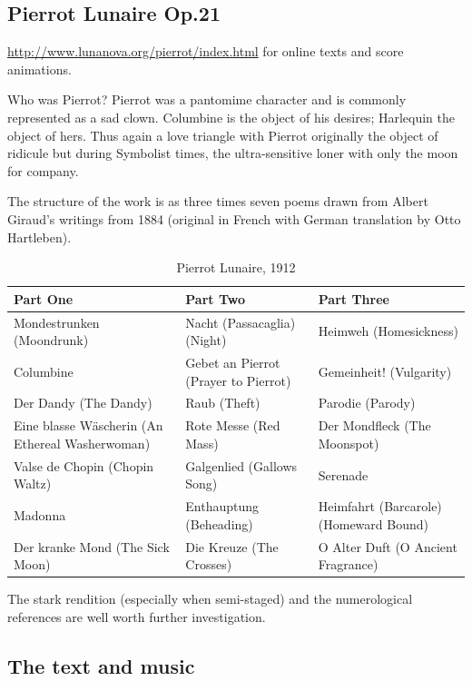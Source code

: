 \subsection{Pierrot Lunaire Op.21}

\url{http://www.lunanova.org/pierrot/index.html} for online texts and score animations. 

Who was Pierrot? Pierrot was a pantomime character and is commonly represented as a sad clown. Columbine is the object of his desires; Harlequin the object of hers. Thus again a love triangle with Pierrot originally the object of ridicule but during Symbolist times, the ultra-sensitive loner with only the moon for company.  

The structure of the work is as three times seven poems drawn from Albert Giraud's writings from 1884 (original in French with German translation by Otto Hartleben).  

\begin{table}[h!]
\begin{tabular}{|p{5.0cm}|p{5.0cm}|p{5.0cm}|} \hline
\textbf{Part One} & \textbf{Part Two} & \textbf{Part Three} \\\hline
Mondestrunken (Moondrunk) & Nacht (Passacaglia) (Night) & Heimweh (Homesickness)\\\hline
Columbine & Gebet an Pierrot (Prayer to Pierrot) & Gemeinheit! (Vulgarity)\\\hline
Der Dandy (The Dandy) & Raub (Theft)  & Parodie (Parody)\\\hline
Eine blasse W\"ascherin (An Ethereal Washerwoman) &  Rote Messe (Red Mass) & Der Mondfleck (The Moonspot)\\\hline
Valse de Chopin (Chopin Waltz) & Galgenlied (Gallows Song)  & Serenade\\\hline
Madonna & Enthauptung (Beheading) & Heimfahrt (Barcarole) (Homeward Bound)\\\hline
Der kranke Mond (The Sick Moon) & Die Kreuze (The Crosses) & O Alter Duft (O Ancient Fragrance)\\\hline
\end{tabular}
\caption{Pierrot Lunaire, 1912}
\label{tab:pierrot}
\end{table}

The stark rendition (especially when semi-staged) and the numerological references are well worth further investigation. 

\newpage
\subsection{The text and music}

